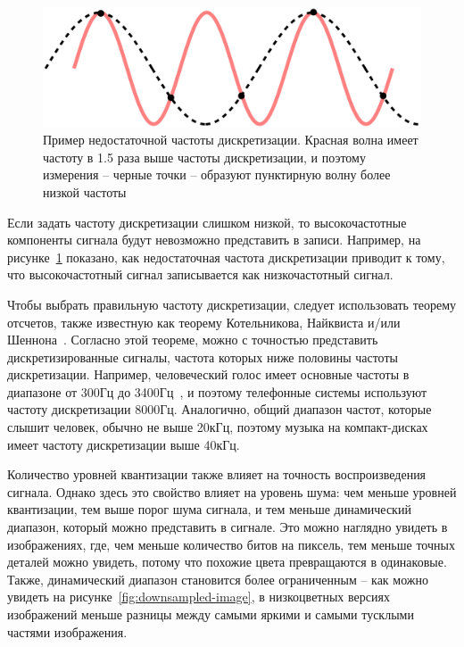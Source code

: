 \documentclass[a4page]{article}
\begin{document}
\begin{figure}
  \includegraphics[width=\linewidth]{CPT-sound-nyquist-thereom-1.5percycle.svg.png}
  \caption{Пример недостаточной частоты дискретизации. Красная волна имеет частоту в 1.5 раза выше частоты дискретизации, и поэтому измерения -- черные точки -- образуют пунктирную волну более низкой частоты~\cite{enwiki:1174270402}}
  \label{fig:pcm-samples}
\end{figure}

Если задать частоту дискретизации слишком низкой, то высокочастотные компоненты сигнала будут невозможно представить в записи.
Например, на рисунке~\ref{fig:pcm-samples} показано, как недостаточная частота дискретизации приводит к тому,
что высокочастотный сигнал записывается как низкочастотный сигнал.

Чтобы выбрать правильную частоту дискретизации, следует использовать теорему отсчетов,
также известную как теорему Котельникова, Найквиста и/или Шеннона~\cite{enwiki:1174270402}.
Согласно этой теореме, можно с точностью представить дискретизированные сигналы,
частота которых ниже половины частоты дискретизации.
Например, человеческий голос имеет основные частоты в диапазоне от 300Гц до 3400Гц~\cite{web:fs-voice-band},
и поэтому телефонные системы используют частоту дискретизации 8000Гц.
Аналогично, общий диапазон частот, которые слышит человек, обычно не выше 20кГц,
поэтому музыка на компакт-дисках имеет частоту дискретизации выше 40кГц.

Количество уровней квантизации также влияет на точность воспроизведения сигнала.
Однако здесь это свойство влияет на уровень шума:
чем меньше уровней квантизации, тем выше порог шума сигнала,
и тем меньше динамический диапазон, который можно представить в сигнале.
Это можно наглядно увидеть в изображениях,
где, чем меньше количество битов на пиксель,
тем меньше точных деталей можно увидеть,
потому что похожие цвета превращаются в одинаковые.
Также, динамический диапазон становится более ограниченным --
как можно увидеть на рисунке~\ref{fig:downsampled-image},
в низкоцветных версиях изображений меньше разницы между самыми яркими и самыми тусклыми частями изображения.
\end{document}
